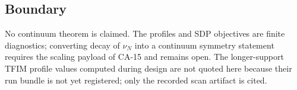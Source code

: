\subsection{Boundary}

No continuum theorem is claimed.  The profiles and SDP objectives are finite
diagnostics; converting decay of \(\nu_N\) into a continuum symmetry statement
requires the scaling payload of CA-15 and remains open.  The longer-support
TFIM profile values computed during design are not quoted here because their
run bundle is not yet registered; only the recorded scan artifact is cited.
